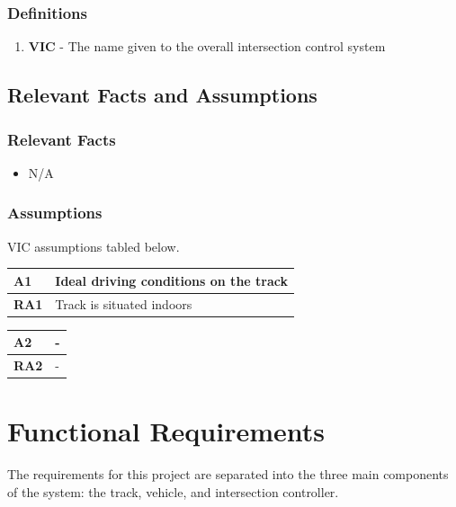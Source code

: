 \documentclass [12pt]{article}
\begin{document}
\subsubsection{Definitions}
\begin{enumerate}
	\itemsep0pt
	\item \textbf{VIC} - The name given to the overall intersection control system
\end{enumerate}

	
\subsection{\large Relevant Facts and Assumptions} 

\subsubsection{Relevant Facts}
\begin{itemize}
	\item N/A
\end{itemize}

\subsubsection{Assumptions}
VIC assumptions tabled below. 
\begin{longtable}{| p{ } | p{ } | }\hline 
\textbf{A1} & \textbf{Ideal driving conditions on the track} \\ \hline
\textbf{RA1} & Track is situated indoors \\ \hline
\end{longtable}


\begin{longtable}{| p{ } | p{ } | }\hline 
\textbf{A2} & \textbf{-} \\ \hline
\textbf{RA2} & - \\ \hline


\end{longtable}




\section {Functional Requirements} 
The requirements for this project are separated into the three main components of the system: the track, vehicle, and intersection controller.
\end{document}
